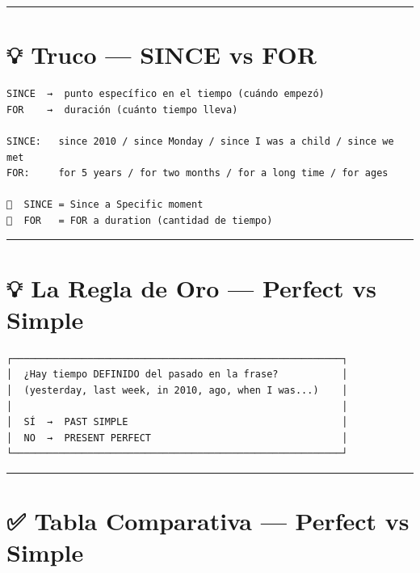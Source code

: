 \documentclass[
  spanish,
  letterpaper,
]{scrbook}
\begin{document}
\begin{center}\rule{0.5\linewidth}{0.5pt}\end{center}

\section{💡 Truco --- SINCE vs FOR}\label{truco-since-vs-for}

\begin{verbatim}
SINCE  →  punto específico en el tiempo (cuándo empezó)
FOR    →  duración (cuánto tiempo lleva)

SINCE:   since 2010 / since Monday / since I was a child / since we met
FOR:     for 5 years / for two months / for a long time / for ages

🧠  SINCE = Since a Specific moment
🧠  FOR   = FOR a duration (cantidad de tiempo)
\end{verbatim}

\begin{center}\rule{0.5\linewidth}{0.5pt}\end{center}

\section{💡 La Regla de Oro --- Perfect vs
Simple}\label{la-regla-de-oro-perfect-vs-simple}

\begin{verbatim}
┌─────────────────────────────────────────────────────────┐
│  ¿Hay tiempo DEFINIDO del pasado en la frase?           │
│  (yesterday, last week, in 2010, ago, when I was...)    │
│                                                         │
│  SÍ  →  PAST SIMPLE                                     │
│  NO  →  PRESENT PERFECT                                 │
└─────────────────────────────────────────────────────────┘
\end{verbatim}

\begin{center}\rule{0.5\linewidth}{0.5pt}\end{center}

\section{✅ Tabla Comparativa --- Perfect vs
Simple}\label{tabla-comparativa-perfect-vs-simple}
\end{document}
